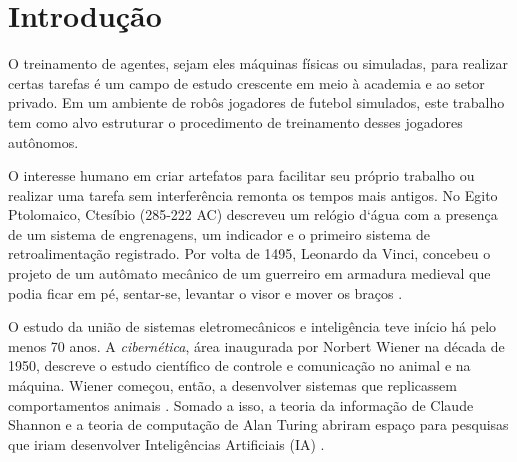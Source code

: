 \chapter{Introdução}
\label{chap:Intro}


O treinamento de agentes, sejam eles máquinas físicas ou simuladas, para realizar certas tarefas é um campo de estudo crescente em meio à academia e ao setor privado. Em um ambiente de robôs jogadores de futebol simulados, este trabalho tem como alvo estruturar o procedimento de treinamento desses jogadores autônomos.

\par O interesse humano em criar artefatos para facilitar seu próprio trabalho ou realizar uma tarefa sem interferência remonta os tempos mais antigos. No Egito Ptolomaico, Ctesíbio (285-222 AC) descreveu um relógio d`água com a presença de um sistema de engrenagens, um indicador e o primeiro sistema de retroalimentação registrado. Por volta de 1495, Leonardo da Vinci, concebeu o projeto de um autômato mecânico de um guerreiro em armadura medieval que podia ficar em pé, sentar-se, levantar o visor e mover os braços \cite{guarnieri2010}. 
\par O estudo da união de sistemas eletromecânicos e inteligência teve início há pelo menos 70 anos. A \textit{cibernética}, área inaugurada por Norbert Wiener na década de 1950, descreve o estudo científico de controle e comunicação no animal e na máquina. Wiener começou, então, a desenvolver sistemas que replicassem comportamentos animais \cite{wiener1948cybernetics}. Somado a isso, a teoria da informação de Claude Shannon e a teoria de computação de Alan Turing abriram espaço para pesquisas que iriam desenvolver Inteligências Artificiais (IA) \cite{pamela2004}.

